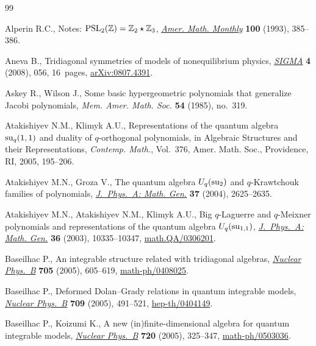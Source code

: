 \documentclass[pdftex]{sigma}
\numberwithin{equation}{section}
\begin{document}
\begin{thebibliography}{99}

\footnotesize\itemsep=0pt




Alperin R.C.,
Notes: ${\rm  {PSL}}_2(\mathbb Z)= \mathbb Z_2 \star \mathbb Z_3$,
\href{http://dx.doi.org/10.2307/2324963}{{\it Amer. Math. Monthly}} {\bf 100} (1993), 385--386.

Aneva B.,
Tridiagonal symmetries of models of nonequilibrium physics,
\href{http://dx.doi.org/10.3842/SIGMA.2008.056}{{\it SIGMA}} {\bf 4} (2008),  056, 16~pages,
\href{http://arxiv.org/abs/0807.4391}{arXiv:0807.4391}.

Askey R., Wilson J.,
Some basic hypergeometric polynomials that generalize Jacobi polynomials,
{\it Mem. Amer. Math. Soc.}  {\bf 54} (1985), no.~319.

Atakishiyev N.M.,  Klimyk  A.U.,
Representations of the quantum algebra ${\rm su}_q(1,1)$ and duality of $q$-orthogonal polynomials,
in Algebraic Structures and their Representations, {\it  Contemp. Math.}, Vol.~376, Amer. Math. Soc., Providence, RI, 2005, 195--206.

 Atakishiyev  M.N.,  Groza V.,
The quantum algebra {$U\sb q(\rm su\sb 2)$} and $q$-Krawtchouk families of polynomials,
\href{http://dx.doi.org/10.1088/0305-4470/37/7/008}{{\it J.~Phys.~A: Math. Gen.}} {\bf 37} (2004), 2625--2635.


Atakishiyev M.N., Atakishiyev N.M., Klimyk A.U.,
Big $q$-Laguerre and $q$-Meixner polynomials and representations of the quantum algebra $U\sb q({\rm su}\sb {1,1})$,
\href{http://dx.doi.org/10.1088/0305-4470/36/41/006}{{\it J.~Phys.~A: Math. Gen.}} {\bf 36} (2003), 10335--10347,
\href{http://arxiv.org/abs/math.QA/0306201}{math.QA/0306201}.

Baseilhac P.,
An integrable structure related with tridiagonal algebras,
\href{http://dx.doi.org/10.1016/j.nuclphysb.2004.11.014}{{\it Nuclear Phys.~B}} {\bf 705} (2005), 605--619,
\href{http://arxiv.org/abs/math-ph/0408025}{math-ph/0408025}.

Baseilhac P.,
Deformed Dolan--Grady relations in quantum integrable models,
\href{http://dx.doi.org/10.1016/j.nuclphysb.2004.12.016}{{\it Nuclear Phys.~B}} {\bf 709} (2005), 491--521,
\href{http://arxiv.org/abs/hep-th/0404149}{hep-th/0404149}.



Baseilhac P.,  Koizumi K.,
A new (in)f\/inite-dimensional algebra for quantum integrable models,
\href{http://dx.doi.org/10.1016/j.nuclphysb.2005.05.021}{{\it  Nuclear Phys.~B}}  {\bf 720}  (2005), 325--347,
\href{http://arxiv.org/abs/math-ph/0503036}{math-ph/0503036}.


\end{thebibliography}
\end{document}
